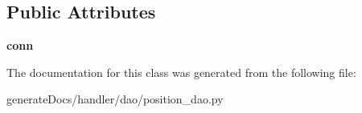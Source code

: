 \subsection*{Public Attributes}
\begin{DoxyCompactItemize}
\item 
\mbox{\label{classposition__dao_1_1_position_d_a_o_ae33c635d2ed65e8fe9a483d383e3aa07}} 
{\bfseries conn}
\end{DoxyCompactItemize}


The documentation for this class was generated from the following file\+:\begin{DoxyCompactItemize}
\item 
generate\+Docs/handler/dao/position\+\_\+dao.\+py\end{DoxyCompactItemize}
